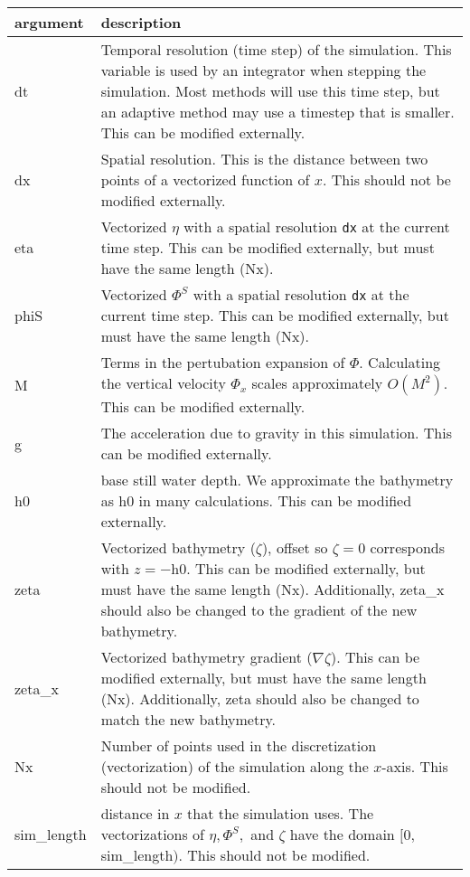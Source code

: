 \documentclass[10pt,a4paper]{article}
\newenvironment{arglist}
    {\begin{center}
    \begin{tabular}{l|p{12cm}}
    argument & description\\
    \hline
    }
    { 
    \end{tabular} 
    \end{center}
    }
\begin{document}
\begin{arglist}
dt & Temporal resolution (time step) of the simulation. This variable is used by an integrator when stepping the simulation. Most methods will use this time step, but an adaptive method may use a timestep that is smaller. This can be modified externally.\\\hline

dx & Spatial resolution. This is the distance between two points of a vectorized function of $x$. This should not be modified externally.\\\hline

eta & Vectorized $\eta$ with a spatial resolution \texttt{dx} at the current time step. This can be modified externally, but must have the same length (Nx).\\\hline

phiS & Vectorized $\Phi^S$ with a spatial resolution \texttt{dx} at the current time step. This can be modified externally, but must have the same length (Nx). \\\hline

M & Terms in the pertubation expansion of $\Phi$. Calculating the vertical velocity $\Phi_x$ scales approximately $O(M^2)$. This can be modified externally.\\\hline

g & The acceleration due to gravity in this simulation. This can be modified externally.\\\hline

h0 & base still water depth. We approximate the bathymetry as h0 in many calculations. This can be modified externally.\\\hline

zeta & Vectorized bathymetry ($\zeta$), offset so $\zeta = 0$ corresponds with $z = -$h0. This can be modified externally, but must have the same length (Nx). Additionally, zeta\_x should also be changed to the gradient of the new bathymetry.\\\hline

zeta\_x & Vectorized bathymetry gradient ($\nabla\zeta$). This can be modified externally, but must have the same length (Nx). Additionally, zeta should also be changed to match the new bathymetry.\\\hline

Nx & Number of points used in the discretization (vectorization) of the simulation along the $x$-axis. This should not be modified.\\\hline

sim\_length & distance in $x$ that the simulation uses. The vectorizations of $\eta,\Phi^S,$ and $\zeta$ have the domain $[0,$ sim\_length$)$. This should not be modified.\\\hline


\end{arglist}
\end{document}

